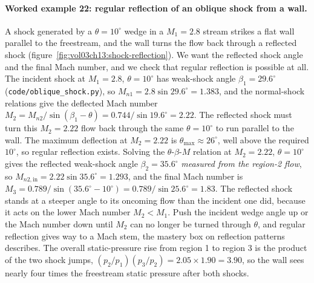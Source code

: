 \paragraph{Worked example 22: regular reflection of an oblique shock
from a wall.} A shock generated by a $\theta = 10^{\circ}$ wedge in a
$M_1 = 2.8$ stream strikes a flat wall parallel to the freestream, and
the wall turns the flow back through a reflected shock
(figure~\ref{fig:vol03ch13:shock-reflection}). We want the reflected
shock angle and the final Mach number, and we check that regular
reflection is possible at all. The incident shock at $M_1 = 2.8$,
$\theta = 10^{\circ}$ has weak-shock angle $\beta_1 = 29.6^{\circ}$
(\texttt{code/oblique\_shock.py}), so $M_{n1} = 2.8\sin 29.6^{\circ} =
1.383$, and the normal-shock relations give the deflected Mach number
$M_2 = M_{n2}/\sin(\beta_1 - \theta) = 0.744/\sin 19.6^{\circ} = 2.22$.
The reflected shock must turn this $M_2 = 2.22$ flow back through the
same $\theta = 10^{\circ}$ to run parallel to the wall. The maximum
deflection at $M_2 = 2.22$ is $\theta_{\max} \approx 26^{\circ}$, well
above the required $10^{\circ}$, so regular reflection exists. Solving
the $\theta$-$\beta$-$M$ relation at $M_2 = 2.22$, $\theta = 10^{\circ}$
gives the reflected weak-shock angle $\beta_2 = 35.6^{\circ}$
\emph{measured from the region-2 flow}, so $M_{n2,\text{in}} =
2.22\sin 35.6^{\circ} = 1.293$, and the final Mach number is
$M_3 = 0.789/\sin(35.6^{\circ} - 10^{\circ}) = 0.789/\sin 25.6^{\circ}
= 1.83$. The reflected shock stands at a steeper angle to its oncoming
flow than the incident one did, because it acts on the lower Mach number
$M_2 < M_1$. Push the incident wedge angle up or the Mach number down
until $M_2$ can no longer be turned through $\theta$, and regular
reflection gives way to a Mach stem, the mastery box on reflection
patterns describes. The overall static-pressure rise from region 1 to
region 3 is the product of the two shock jumps,
$(p_2/p_1)(p_3/p_2) = 2.05\times 1.90 = 3.90$, so the wall sees nearly
four times the freestream static pressure after both shocks.



